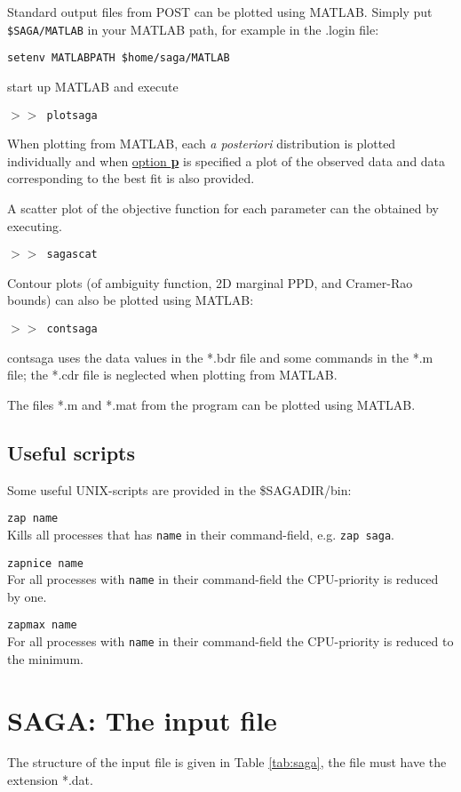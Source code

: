 \documentclass{saclantc}
\begin{document}
Standard
output files from {\sf POST} can be plotted using MATLAB. Simply put 
{\tt \$SAGA/MATLAB} in your MATLAB path, for example in the .login file:

{\tt setenv MATLABPATH  \$home/saga/MATLAB} 

start up MATLAB and execute

{\tt $> >$ plotsaga}

When plotting from MATLAB, each {\it a posteriori} distribution is
plotted individually and when  
\underline{option {\bf p}} is specified a plot of the observed data and data
corresponding to the best fit is also provided.

A scatter plot of the objective function for each parameter can the
obtained by executing. 

{\tt $> >$ sagascat}

Contour plots (of ambiguity function, 2D marginal PPD, and Cramer-Rao
bounds) can also be plotted using MATLAB:

{\tt $> >$ contsaga}

 {\sf contsaga} uses the data values in the
*.bdr file and some commands in the *.m file; the *.cdr file is
neglected when plotting from MATLAB. 


The files *.m and *.mat from the program can be plotted using MATLAB.

\subsection{Useful scripts}
Some useful UNIX-scripts  are provided in the \$SAGADIR/bin:

\noindent
{\tt zap name}\\
Kills all processes that has {\tt name} in their command-field,
e.g. {\tt zap saga}.

\noindent
{\tt zapnice name}\\
For all processes with {\tt name} in their command-field the
CPU-priority is reduced by one.

\noindent
{\tt zapmax name}\\
For all processes with {\tt name} in their command-field the
CPU-priority is reduced to the minimum.


\newpage
\section{SAGA: The input file}
The structure of the input file is given in Table \ref{tab:saga}, the file must
have the extension *.dat.
\end{document}
